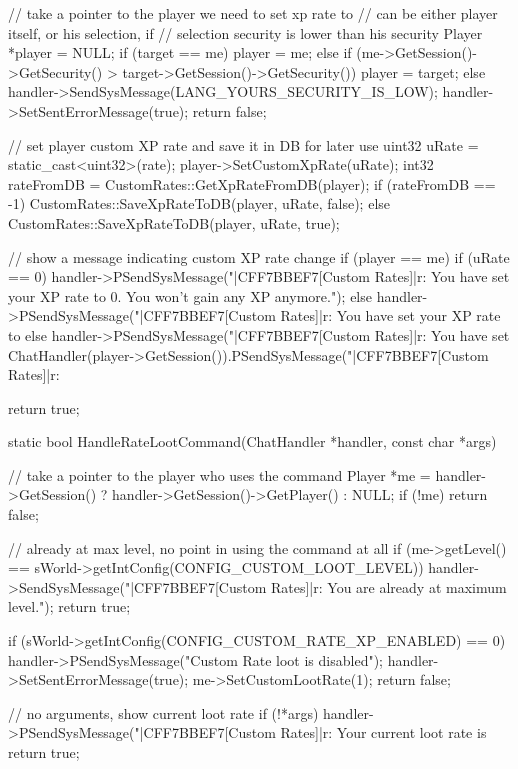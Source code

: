 {{		// take a pointer to the player we need to set xp rate to
		// can be either player itself, or his selection, if
		// selection security is lower than his security
		Player *player = NULL;
		if (target == me)
			player = me;
		else
		{
			if (me->GetSession()->GetSecurity() > target->GetSession()->GetSecurity())
				player = target;
			else
			{
				handler->SendSysMessage(LANG_YOURS_SECURITY_IS_LOW);
				handler->SetSentErrorMessage(true);
				return false;
			}
		}

		// set player custom XP rate and save it in DB for later use
		uint32 uRate = static_cast<uint32>(rate);
		player->SetCustomXpRate(uRate);
		int32 rateFromDB = CustomRates::GetXpRateFromDB(player);
		if (rateFromDB == -1)
			CustomRates::SaveXpRateToDB(player, uRate, false);
		else
			CustomRates::SaveXpRateToDB(player, uRate, true);

		// show a message indicating custom XP rate change
		if (player == me)
		{
			if (uRate == 0)
				handler->PSendSysMessage("|CFF7BBEF7[Custom Rates]|r: You have set your XP rate to 0. You won't gain any XP anymore.");
			else 
				handler->PSendSysMessage("|CFF7BBEF7[Custom Rates]|r: You have set your XP rate to %
		}
		else
		{
			handler->PSendSysMessage("|CFF7BBEF7[Custom Rates]|r: You have set %
			ChatHandler(player->GetSession()).PSendSysMessage("|CFF7BBEF7[Custom Rates]|r: %
		}

		return true;
	}

	static bool HandleRateLootCommand(ChatHandler *handler, const char *args)
	{
		// take a pointer to the player who uses the command
		Player *me = handler->GetSession() ? handler->GetSession()->GetPlayer() : NULL;
		if (!me)
			return false;

		// already at max level, no point in using the command at all
		if (me->getLevel() == sWorld->getIntConfig(CONFIG_CUSTOM_LOOT_LEVEL))
		{
			handler->SendSysMessage("|CFF7BBEF7[Custom Rates]|r: You are already at maximum level.");
			return true;
		}

		if (sWorld->getIntConfig(CONFIG_CUSTOM_RATE_XP_ENABLED) == 0)
		{
			handler->PSendSysMessage("Custom Rate loot is disabled");
			handler->SetSentErrorMessage(true);
			me->SetCustomLootRate(1);
			return false;
		}

		// no arguments, show current loot rate
		if (!*args)
		{
			handler->PSendSysMessage("|CFF7BBEF7[Custom Rates]|r: Your current loot rate is %
			return true;
		}

}}
